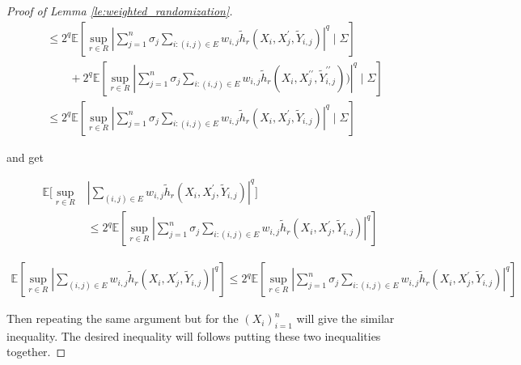 \documentclass[letterpaper]{article} %
\def\DoubleColumn{}
\def\DoubleColumnEnd{}
\def\SingleColumn{}
\def\SingleColumnEnd{}
\newcommand{\E}{\mathbb{E}}
\newcommand{\pair}[1]{(#1)}
\begin{document}
\begin{proof}[Proof of Lemma \ref{le:weighted_randomization}]
\begin{align*}
    &\le 2^q\E[\sup_{r\in R}|\sum_{j=1}^n \sigma_j \sum_{i:\pair{i,j}\in E} w_{i,j}\tilde{h}_r(X_i,X_j^\prime,\tilde{Y}_{i,j})|^q\mid \Sigma]\\
    &\qquad+ 2^q\E[\sup_{r\in R}|\sum_{j=1}^n \sigma_j \sum_{i:\pair{i,j}\in E} w_{i,j}\tilde{h}_r(X_i,X_j^{\prime\prime},\tilde{Y}_{i,j}^{\prime\prime}))|^q\mid \Sigma]\\
    &\le 2^q\E[\sup_{r\in R}|\sum_{j=1}^n\sigma_j\sum_{i:\pair{i,j}\in E}w_{i,j} \tilde{h}_r(X_i,X_j^\prime,\tilde{Y}_{i,j})|^q\mid \Sigma]
\end{align*}
\SingleColumnEnd
and get
\DoubleColumn
\begin{align*}
    \E[\sup_{r\in R}&|\sum_{\pair{i,j}\in E} w_{i,j}\tilde{h}_r(X_i,X_j^\prime,\tilde{Y}_{i,j})|^q] \\
    &\le 2^q\E[\sup_{r\in R}|\sum_{j=1}^n\sigma_j\sum_{i:\pair{i,j}\in E}w_{i,j} \tilde{h}_r(X_i,X_j^\prime,\tilde{Y}_{i,j})|^q]
\end{align*}
\DoubleColumnEnd
\SingleColumn
\begin{align*}
    \E[\sup_{r\in R}|\sum_{\pair{i,j}\in E} w_{i,j}\tilde{h}_r(X_i,X_j^\prime,\tilde{Y}_{i,j})|^q] \le 2^q\E[\sup_{r\in R}|\sum_{j=1}^n\sigma_j\sum_{i:\pair{i,j}\in E}w_{i,j} \tilde{h}_r(X_i,X_j^\prime,\tilde{Y}_{i,j})|^q]
\end{align*}
\SingleColumnEnd
Then repeating the same argument but for the $(X_i)_{i=1}^n$ will give the similar inequality. The desired inequality will follows putting these two inequalities together.
\end{proof}
\end{document}
